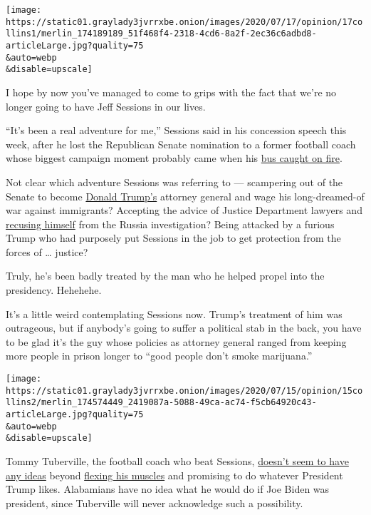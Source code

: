 \texttt{[image: https://static01.graylady3jvrrxbe.onion/images/2020/07/17/opinion/17collins1/merlin\_174189189\_51f468f4-2318-4cd6-8a2f-2ec36c6adbd8-articleLarge.jpg?quality=75\\\&auto=webp\\\&disable=upscale]}

I hope by now you've managed to come to grips with the fact that we're
no longer going to have Jeff Sessions in our lives.

``It's been a real adventure for me,'' Sessions said in his concession
speech this week, after he lost the Republican Senate nomination to a
former football coach whose biggest campaign moment probably came when
his
\href{https://www.al.com/news/2020/07/tommy-tuberville-campaign-bus-catches-fire-on-alabama-interstate.html}{bus
caught on fire}.

Not clear which adventure Sessions was referring to --- scampering out
of the Senate to become
\href{https://www.nytimes3xbfgragh.onion/2019/07/29/nyregion/trump-sharpton-ny-history.html}{Donald
Trump's} attorney general and wage his long-dreamed-of war against
immigrants? Accepting the advice of Justice Department lawyers and
\href{https://www.nytimes3xbfgragh.onion/2018/01/04/us/politics/trump-sessions-russia-mcgahn.html}{recusing
himself} from the Russia investigation? Being attacked by a furious
Trump who had purposely put Sessions in the job to get protection from
the forces of \ldots{} justice?

Truly, he's been badly treated by the man who he helped propel into the
presidency. Hehehehe.

It's a little weird contemplating Sessions now. Trump's treatment of him
was outrageous, but if anybody's going to suffer a political stab in the
back, you have to be glad it's the guy whose policies as attorney
general ranged from keeping more people in prison longer to ``good
people don't smoke marijuana.''

\texttt{[image: https://static01.graylady3jvrrxbe.onion/images/2020/07/15/opinion/15collins2/merlin\_174574449\_2419087a-5088-49ca-ac74-f5cb64920c43-articleLarge.jpg?quality=75\\\&auto=webp\\\&disable=upscale]}

Tommy Tuberville, the football coach who beat Sessions,
\href{https://www.newsbreak.com/alabama/birmingham/news/0PZMVnBr/tommy-tuberville-goes-low-profile-to-run-out-clock-in-runoff-with-jeff-sessions}{doesn't
seem to have any ideas} beyond
\href{https://www.youtube.com/watch?v=NmgO9qwgPEc}{flexing his muscles}
and promising to do whatever President Trump likes. Alabamians have no
idea what he would do if Joe Biden was president, since Tuberville will
never acknowledge such a possibility.

